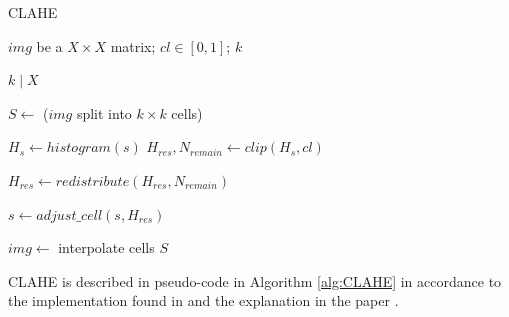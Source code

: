 \begin{algorithm}[h]
    \caption{CLAHE}\label{alg:CLAHE}
    \begin{algorithmic}[1]
        \Require $img$ be a $X\times X$ matrix; $cl \in [0, 1]$; $k$

        \Ensure $k \mid X$

        \State $S \gets $ ($img$ split into $k\times k$ cells)\label{line:CLAHE:split}

            \State $H_s \gets histogram(s)$
            \State $H_{res}, N_{remain} \gets clip(H_s, cl)$

            \State $H_{res} \gets redistribute(H_{res}, N_{remain})$\label{line:CLAHE:redistribute}

            \State $s \gets adjust\_cell(s, H_{res})$
        \EndFor

        \State $img \gets$ interpolate cells $S$

    \end{algorithmic}
\end{algorithm}

CLAHE is described in pseudo-code in Algorithm \ref{alg:CLAHE} in accordance to the implementation found in \cite{site:CLAHE_code} and the explanation in the paper \cite{article:CLAHE_explanation}.

